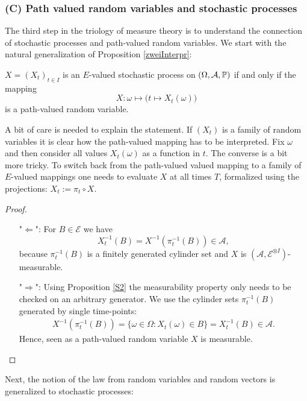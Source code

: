 \subsubsection{(C) Path valued random variables and stochastic processes}
The third step in the triology of measure theory is to understand the connection of stochastic processes and path-valued random variables. We start with the natural generalization of Proposition \ref{zweiInterpr}:
\begin{llemma}
\begin{prop}\label{zweiInterprb}
		$X=(X_t)_{t\in I}$ is an $E$-valued stochastic process on $(\Omega, \mathcal A, \P)$ if and only if the mapping $$X:\omega\mapsto \big(t\mapsto X_t(\omega)\big)$$ is a path-valued random variable.
	\end{prop}
\end{llemma}
A bit of care is needed to explain the statement. If $(X_t)$ is a family of random variables it is clear how the path-valued mapping has to be interpreted. Fix $\omega$ and then consider all values $X_t(\omega)$ as a function in $t$. The converse is a bit more tricky. To switch back from the path-valued valued mapping to a family of $E$-valued mappings one needs to evaluate $X$ at all times $T$, formalized using the projections: $X_t:=\pi_t\circ X$. 
\begin{proof}[Proof]
	\begin{itemize}
		\item["$\Leftarrow$":] 
		For $B \in \mathcal E$ we have 
\[ X_t^{-1} (B) = X^{-1}(\pi_t^{-1}(B)) \in \mathcal A, \]
because $\pi_t^{-1}(B)$ is a finitely generated cylinder set and $X$ is $(\mathcal A, \mathcal E^{\otimes I})$-measurable.
		\item["$\Rightarrow$":] Using Proposition \ref{S2} the measurability property only needs to be checked on an arbitrary generator. We use the cylinder sets $\pi_t^{-1}(B)$ generated by single time-points:
		\begin{align*}
			X^{-1}(\pi_t^{-1}(B)) =\{\omega \in \Omega: X_t(\omega)\in B\}=X^{-1}_t(B)\in \mathcal A.
		\end{align*}
		Hence, seen as a path-valued random variable $X$ is measurable.
	\end{itemize}
\end{proof}
Next, the notion of the law from random variables and random vectors is generalized to stochastic processes:
